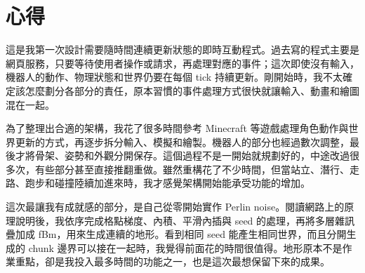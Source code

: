 \section{心得}

這是我第一次設計需要隨時間連續更新狀態的即時互動程式。過去寫的程式主要是網頁服務，只要等待使用者操作或請求，再處理對應的事件；這次即使沒有輸入，機器人的動作、物理狀態和世界仍要在每個 tick 持續更新。剛開始時，我不太確定該怎麼劃分各部分的責任，原本習慣的事件處理方式很快就讓輸入、動畫和繪圖混在一起。

為了整理出合適的架構，我花了很多時間參考 Minecraft 等遊戲處理角色動作與世界更新的方式，再逐步拆分輸入、模擬和繪製。機器人的部分也經過數次調整，最後才將骨架、姿勢和外觀分開保存。這個過程不是一開始就規劃好的，中途改過很多次，有些部分甚至直接推翻重做。雖然重構花了不少時間，但當站立、潛行、走路、跑步和碰撞陸續加進來時，我才感覺架構開始能承受功能的增加。

這次最讓我有成就感的部分，是自己從零開始實作 Perlin noise。閱讀網路上的原理說明後，我依序完成格點梯度、內積、平滑內插與 seed 的處理，再將多層雜訊疊加成 fBm，用來生成連續的地形。看到相同 seed 能產生相同世界，而且分開生成的 chunk 邊界可以接在一起時，我覺得前面花的時間很值得。地形原本不是作業重點，卻是我投入最多時間的功能之一，也是這次最想保留下來的成果。
